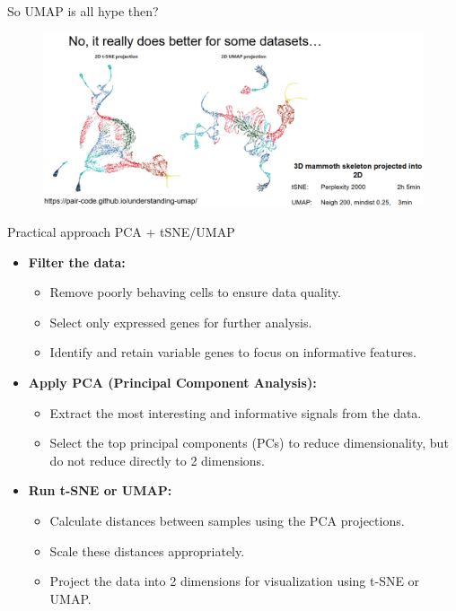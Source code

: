 \begin{frame}[allowframebreaks]{So UMAP is all hype then?}
    \begin{figure}
        \centering
        \includegraphics[width=1\textwidth,keepaspectratio]{images/dul/dim-reduce/slide_43_1_img.png}
    \end{figure}
\end{frame}


\begin{frame}[allowframebreaks]{Practical approach PCA + tSNE/UMAP}
    \begin{itemize}
        \item \textbf{Filter the data:}
        \begin{itemize}
            \item Remove poorly behaving cells to ensure data quality.
            \item Select only expressed genes for further analysis.
            \item Identify and retain variable genes to focus on informative features.
        \end{itemize}
        \item \textbf{Apply PCA (Principal Component Analysis):}
        \begin{itemize}
            \item Extract the most interesting and informative signals from the data.
            \item Select the top principal components (PCs) to reduce dimensionality, but do not reduce directly to 2 dimensions.
        \end{itemize}
        \item \textbf{Run t-SNE or UMAP:}
        \begin{itemize}
            \item Calculate distances between samples using the PCA projections.
            \item Scale these distances appropriately.
            \item Project the data into 2 dimensions for visualization using t-SNE or UMAP.
        \end{itemize}
    \end{itemize}
\end{frame}

